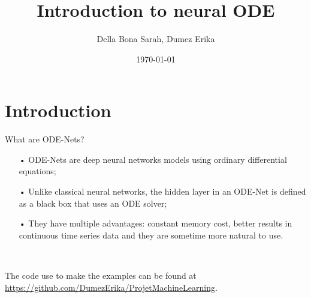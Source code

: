 \documentclass[11pt]{beamer}
\title{Introduction to neural ODE}
\author{Della Bona Sarah, Dumez Erika}
\date{\today}
\begin{document}
\AtBeginSubsection[]{
\begin{frame}
\tableofcontents[ 
    currentsubsection, 
    hideothersubsections, 
    sectionstyle=show/shaded, 
    subsectionstyle=show/hide
    ]

\end{frame}}

\AtBeginSection[]{
\begin{frame}
\tableofcontents[ 
    currentsection, 
    hideothersubsections, 
    sectionstyle=show/shaded, 
    subsectionstyle=show/hide
    ]

\end{frame}}

\begin{frame}
\titlepage
\end{frame}

\begin{frame}
\tableofcontents[hidesubsections]
\end{frame}

\section{Introduction}
\begin{frame}{What are ODE-Nets?}

\begin{itemize}
\item[•] ODE-Nets are deep neural networks models using ordinary differential equations;
\item[•] Unlike classical neural networks, the hidden layer in an ODE-Net is defined as a black box that uses an ODE solver;
\item[•] They have multiple advantages: constant memory cost, better results in continuous time series data and they are sometime more natural to use.
\end{itemize}

~

The code use to make the examples can be found at \url{https://github.com/DumezErika/ProjetMachineLearning}.
\end{frame}
\end{document}
